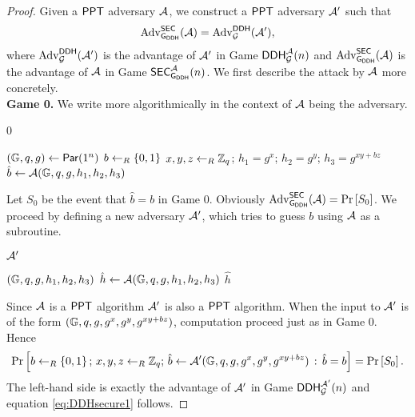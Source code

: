 \begin{proof}
Given a $\mathsf{PPT}$ adversary $\mathcal{A}$, we construct a $\mathsf{PPT}$ adversary $\mathcal{A}'$ such that
\begin{align}
\label{eq:DDHsecure1}
	\operatorname{Adv}_{\operatorname{\mathsf{G}}_{\mathsf{DDH}}}^{\mathsf{SEC}}(\mathcal{A}) = \operatorname{Adv}_{\operatorname{\mathcal{G}}}^{\mathsf{DDH}}(\mathcal{A}'),
\end{align}
where $\operatorname{Adv}_{\operatorname{\mathcal{G}}}^{\mathsf{DDH}}(\mathcal{A}')$ is the advantage of $\mathcal{A}'$ in Game $\mathsf{DDH}_{\operatorname{\mathcal{G}}}^{\mathcal{A}}(n)$ and $\operatorname{Adv}_{\operatorname{\mathsf{G}}_{\mathsf{DDH}}}^{\mathsf{SEC}}(\mathcal{A})$ is the advantage of $\mathcal{A}$ in Game $\mathsf{SEC}_{\operatorname{\mathsf{G}}_{\mathsf{DDH}}}^{\mathcal{A}}(n)$. We first describe the attack by $\mathcal{A}$ more concretely. \\

\newpage
\noindent\textbf{Game 0.} We write  more algorithmically in the context of $\mathcal{A}$ being the adversary.

\vspace*{-.3cm}
\begin{Algorithm}[]{8cm}
\captionGame
\caption{0}
\label{alg:DDHsecure2}
\begin{algorithmic}[1]
\State $(\mathbb{G},q,g)\leftarrow\operatorname{\mathsf{Par}}(1^n)$  
\State $b\leftarrow_R\left\{0,1\right\}$ 
\State $x,y,z\leftarrow_R\mathbb{Z}_q$; $h_1=g^x$; $h_2=g^y$; $h_3 = g^{xy+bz}$
\State $\hat{b}\leftarrow\mathcal{A}(\mathbb{G},q,g,h_1,h_2,h_3)$
\end{algorithmic}
\end{Algorithm}

Let $S_0$ be the event that $\hat{b} = b$ in Game 0. Obviously $\operatorname{Adv}_{\operatorname{\mathsf{G}}_{\mathsf{DDH}}}^{\mathsf{SEC}}(\mathcal{A})=\operatorname{Pr}\left[{S_0}\right]$. We proceed by defining a new adversary $\mathcal{A}'$, which tries to guess $b$ using $\mathcal{A}$ as a subroutine.

\vspace*{-.3cm}
\begin{Algorithm}[]{6cm}
\captionAdversary
\caption{$\mathcal{A}'$}
\label{alg:DDHsecure3}
\begin{algorithmic}[1]
\Require $(\mathbb{G},q,g,h_1,h_2,h_3)$ 
\State $\hat{h}\leftarrow\mathcal{A}(\mathbb{G},q,g,h_1,h_2,h_3)$
\State \Ret $\hat{h}$
\end{algorithmic}
\end{Algorithm}

Since $\mathcal{A}$ is a $\mathsf{PPT}$ algorithm $\mathcal{A}'$ is also a $\mathsf{PPT}$ algorithm. When the input to $\mathcal{A}'$ is of the form $(\mathbb{G},q,g,g^x,g^y,g^{xy+bz})$, computation proceed just as in Game 0. Hence
\begin{align*}
	\operatorname{Pr}\left[{b\leftarrow_R\left\{0,1\right\};\,x,y,z\leftarrow_R\mathbb{Z}_q;\, \hat{b}\leftarrow\mathcal{A}'(\mathbb{G},q,g,g^x,g^y,g^{xy+bz})\, :\, \hat{b}=b}\right]=\operatorname{Pr}\left[{S_0}\right].
\end{align*}
The left-hand side is exactly the advantage of $\mathcal{A}'$ in Game $\mathsf{DDH}_{\operatorname{\mathcal{G}}}^{\mathcal{A}'}(n)$ and equation \ref{eq:DDHsecure1} follows.
\end{proof}

